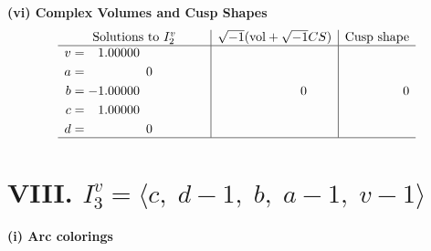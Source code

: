 \documentclass[1p]{elsarticle_modified}
\theoremstyle{definition}
\newcommand{\I}{\sqrt{-1}}
\begin{document}
\newpage\flushleft \textbf{(vi) Complex Volumes and Cusp Shapes}
$$\begin{array}{c|c|c}  
\text{Solutions to }I^v_{2}& \I (\text{vol} + \sqrt{-1}CS) & \text{Cusp shape}\\
 \hline 
\begin{aligned}
v &= \phantom{-}1.00000\phantom{ +0.000000I} \\
a &= \phantom{-0.000000 } 0 \\
b &= -1.00000\phantom{ +0.000000I} \\
c &= \phantom{-}1.00000\phantom{ +0.000000I} \\
d &= \phantom{-0.000000 } 0\end{aligned}
 & \phantom{-0.000000 } 0 & \phantom{-0.000000 } 0\\
 \hline 
 \end{array}$$\newpage\newpage\renewcommand{\arraystretch}{1}
\centering \section*{VIII. $I^v_{3}= \langle c,\;d-1,\;b,\;a-1,\;v-1 \rangle$}
\flushleft \textbf{(i) Arc colorings}\\
\end{document}
